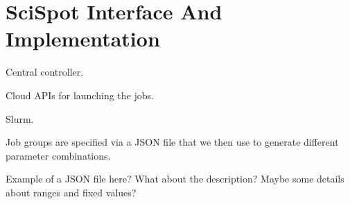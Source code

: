 \section{SciSpot Interface And Implementation}


Central controller.

Cloud APIs for launching the jobs.

Slurm.

Job groups are specified via a JSON file that we then use to generate different parameter combinations.

Example of a JSON file here? What about the description? Maybe some details about ranges and fixed values? 




